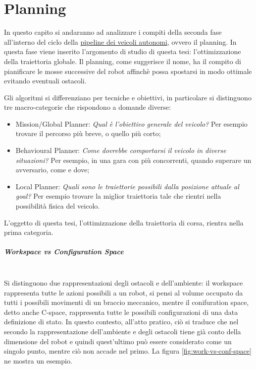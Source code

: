 
\chapter{Planning}
\label{chap:plan}

In questo capito si andaranno ad analizzare i compiti della seconda fase all'interno del ciclo della
\hyperref[sec:pipeline]{pipeline dei veicoli autonomi}, ovvero il planning. In questa fase viene inserito
l'argomento di studio di questa tesi: l'ottimizzazione della traiettoria globale.
Il planning, come suggerisce il nome, ha il compito di pianificare le mosse successive del robot affinchè
possa spostarsi in modo ottimale evitando eventuali ostacoli.

\bigskip
\noindent Gli algoritmi si differenziano per tecniche e obiettivi, in particolare si distinguono tre
macro-categorie che rispondono a domande diverse:
\begin{itemize}
	\item Mission/Global Planner: \textit{Qual è l'obiettivo generale del veicolo?} Per esempio trovare
	il percorso più breve, o quello più corto; 
	\item Behavioural Planner: \textit{Come dovrebbe comportarsi il veicolo in diverse situazioni?} Per
	esempio, in una gara con più concorrenti, quando superare un avversario, come e dove;
	\item Local Planner: \textit{Quali sono le traiettorie possibili dalla posizione attuale al goal?}
	Per esempio trovare la miglior traiettoria tale che rientri nella possibilità fisica del veicolo.
\end{itemize}
L'oggetto di questa tesi, l'ottimizzazione della traiettoria di corsa, rientra nella prima categoria.


\paragraph{\textit{Workspace} vs \textit{Configuration Space}} \ \\
Si distinguono due rappresentazioni degli ostacoli e dell'ambiente: il workspace rappresenta tutte le
azioni possibili a un robot, si pensi al volume occupato da tutti i possibili movimenti di un braccio
meccanico, mentre il conifuration space, detto anche C-space, rappresenta tutte le possibili
configurazioni di una data definizione di stato. In questo contesto, all'atto pratico, ciò si traduce che
nel secondo la rappresentazione dell'ambiente e degli ostacoli tiene già conto della dimensione del
robot e quindi quest'ultimo può essere considerato come un singolo punto, mentre ciò non accade nel
primo. La figura \ref{fig:work-vs-conf-space} ne mostra un esempio.

